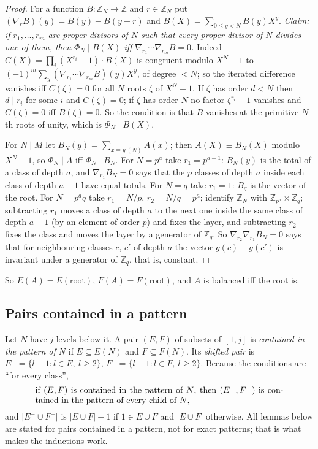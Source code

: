 \documentclass[11pt,a4paper]{amsart}
\theoremstyle{definition}
\theoremstyle{remark}
\newcommand{\Z}{\mathbb{Z}}
\begin{document}
\begin{proof}
For a function $B\colon\Z_N\to\Z$ and $r\in\Z_N$ put $(\nabla_rB)(y)=B(y)-B(y-r)$ and
$B(X)=\sum_{0\le y<N}B(y)X^y$. \emph{Claim: if $r_1,\dots,r_m$ are proper divisors of $N$ such that every
proper divisor of $N$ divides one of them, then $\Phi_N\mid B(X)$ iff $\nabla_{r_1}\cdots\nabla_{r_m}B=0$.}
Indeed $C(X)=\prod_i(X^{r_i}-1)\cdot B(X)$ is congruent modulo $X^N-1$ to
$(-1)^m\sum_y(\nabla_{r_1}\cdots\nabla_{r_m}B)(y)X^y$, of degree $<N$; so the iterated difference vanishes iff
$C(\zeta)=0$ for all $N$ roots $\zeta$ of $X^N-1$. If $\zeta$ has order $d<N$ then $d\mid r_i$ for some $i$
and $C(\zeta)=0$; if $\zeta$ has order $N$ no factor $\zeta^{r_i}-1$ vanishes and $C(\zeta)=0$ iff
$B(\zeta)=0$. So the condition is that $B$ vanishes at the primitive $N$-th roots of unity, which is
$\Phi_N\mid B(X)$.

For $N\mid M$ let $B_N(y)=\sum_{x\equiv y\ (N)}A(x)$; then $A(X)\equiv B_N(X)$ modulo $X^N-1$, so
$\Phi_N\mid A$ iff $\Phi_N\mid B_N$. For $N=p^a$ take $r_1=p^{a-1}$: $B_N(y)$ is the total of a class of depth
$a$, and $\nabla_{r_1}B_N=0$ says that the $p$ classes of depth $a$ inside each class of depth $a-1$ have equal
totals. For $N=q$ take $r_1=1$: $B_q$ is the vector of the root. For $N=p^aq$ take $r_1=N/p$, $r_2=N/q=p^a$;
identify $\Z_N$ with $\Z_{p^a}\times\Z_q$; subtracting $r_1$ moves a class of depth $a$ to the next one
inside the same class of depth $a-1$ (by an element of order $p$) and fixes the layer, and subtracting $r_2$
fixes the class and moves the layer by a generator of $\Z_q$. So $\nabla_{r_2}\nabla_{r_1}B_N=0$ says that
for neighbouring classes $c$, $c'$ of depth $a$ the vector $g(c)-g(c')$ is invariant under a generator of
$\Z_q$, that is, constant.
\end{proof}

So $E(A)=E(\mathrm{root})$, $F(A)=F(\mathrm{root})$, and $A$ is balanced iff the root is.

\subsection*{Pairs contained in a pattern} Let $N$ have $j$ levels below it. A pair $(E,F)$ of subsets of
$[1,j]$ is \emph{contained in the pattern of $N$} if $E\subseteq E(N)$ and $F\subseteq F(N)$. Its
\emph{shifted pair} is $E^-=\{l-1:l\in E,\ l\ge 2\}$, $F^-=\{l-1:l\in F,\ l\ge2\}$. Because the conditions
are ``for every class'',
\begin{equation}\label{eq:shift}
\parbox{0.84\textwidth}{if $(E,F)$ is contained in the pattern of $N$, then $(E^-,F^-)$ is contained in
the pattern of every child of $N$,}
\end{equation}
and $|E^-\cup F^-|$ is $|E\cup F|-1$ if $1\in E\cup F$ and $|E\cup F|$ otherwise. All lemmas below are stated
for pairs contained in a pattern, not for exact patterns; that is what makes the inductions work.
\end{document}
